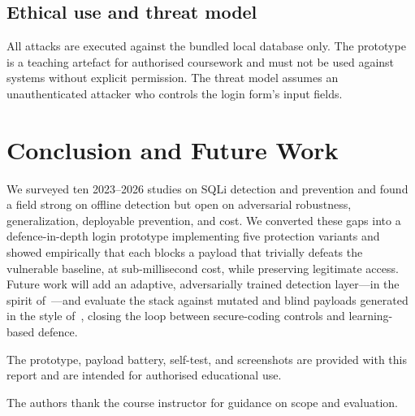 \documentclass[pdflatex,sn-mathphys-num]{sn-jnl}
\begin{document}
\subsection{Ethical use and threat model}
All attacks are executed against the bundled local database only. The prototype is a
teaching artefact for authorised coursework and must not be used against systems without
explicit permission. The threat model assumes an unauthenticated attacker who controls
the login form's input fields.

\section{Conclusion and Future Work}\label{sec:conclusion}

We surveyed ten 2023--2026 studies on SQLi detection and prevention and found a field
strong on offline detection but open on adversarial robustness, generalization,
deployable prevention, and cost. We converted these gaps into a defence-in-depth login
prototype implementing five protection variants and showed empirically that each blocks
a payload that trivially defeats the vulnerable baseline, at sub-millisecond cost, while
preserving legitimate access. Future work will add an adaptive, adversarially trained
detection layer---in the spirit of~\cite{floris2025modsec}---and evaluate the stack
against mutated and blind payloads generated in the style of~\cite{qu2024advsqli},
closing the loop between secure-coding controls and learning-based defence.

\backmatter

The prototype, payload battery, self-test, and screenshots are provided with this
report and are intended for authorised educational use.

The authors thank the course instructor for guidance on scope and evaluation.


\end{document}
